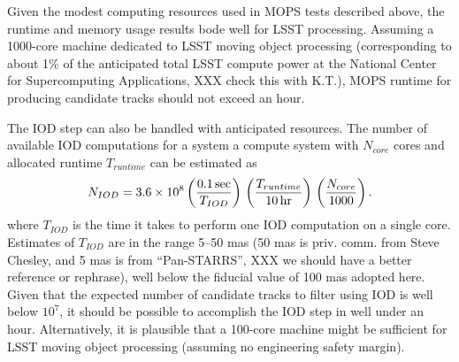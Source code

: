 Given the modest computing resources used in MOPS tests described above, the runtime and memory 
usage results bode well for LSST processing. Assuming a 1000-core machine dedicated to LSST moving 
object processing (corresponding to about 1\% of the anticipated total LSST compute power at the 
National Center for Supercomputing Applications, XXX check this with K.T.), MOPS runtime for 
producing candidate tracks should not exceed an hour. 

The IOD step can also be handled with anticipated resources. The number of available IOD computations 
for a system a compute system with $N_{core}$ cores and allocated runtime $T_{runtime}$ can be estimated 
as 
\begin{equation}
  N_{IOD} = 3.6\times10^8 \left({ 0.1\,{\rm sec} \over T_{IOD}}\right) \,
                                         \left({ T_{runtime}  \over 10\,{\rm hr} }\right) \,
                                         \left({ N_{core}  \over 1000}\right).
\end{equation}
where $T_{IOD}$ is the time it takes to perform one IOD computation on a single core. Estimates
of $T_{IOD}$ are in the range 5--50 mas (50 mas is priv. comm. from Steve Chesley, and 5 mas is
from ``Pan-STARRS'', XXX we should have a better reference or rephrase), well below the fiducial
value of 100 mas adopted here. Given that the expected number of candidate tracks to filter using
IOD is well below $10^7$, it should be possible to accomplish the IOD step in well under an hour. 
Alternatively, it is plausible that a 100-core machine might be sufficient for LSST moving object 
processing (assuming no engineering safety margin). 
